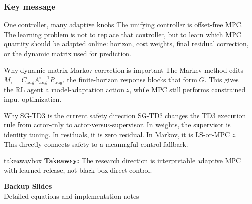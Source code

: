 \documentclass[aspectratio=169]{beamer}
\newcommand{\takeawaybox}[1]{%
\vspace{0.02cm}
\begin{center}
\begin{beamercolorbox}[wd=0.94\textwidth,sep=3pt,center,rounded=true,shadow=false]{takeawaybox}
\scriptsize
\textbf{\textcolor{maroon1}{Takeaway:}} #1
\end{beamercolorbox}
\end{center}
}
\begin{document}
\begin{frame}
\frametitle{\large \textbf{Key message}}
\scriptsize

\begin{block}{One controller, many adaptive knobs}
\justifying
The unifying controller is offset-free MPC. The learning problem is not to replace that controller, but to learn which MPC quantity should be adapted online: horizon, cost weights, final residual correction, or the dynamic matrix used for prediction.
\end{block}

\begin{block}{Why dynamic-matrix Markov correction is important}
\justifying
The Markov method edits \(M_i=C_{\mathrm{aug}}A_{\mathrm{aug}}^{i-1}B_{\mathrm{aug}}\), the finite-horizon response blocks that form \(G\). This gives the RL agent a model-adaptation action \(z\), while MPC still performs constrained input optimization.
\end{block}

\begin{block}{Why SG-TD3 is the current safety direction}
\justifying
SG-TD3 changes the TD3 execution rule from actor-only to actor-versus-supervisor. In weights, the supervisor is identity tuning. In residuals, it is zero residual. In Markov, it is LS-or-MPC \(z\). This directly connects safety to a meaningful control fallback.
\end{block}

\takeawaybox{The research direction is interpretable adaptive MPC with learned release, not black-box direct control.}
\end{frame}

\begin{frame}
\begin{center}
\Large \textbf{Backup Slides}\\[0.5cm]
\small Detailed equations and implementation notes
\end{center}
\end{frame}
\end{document}
